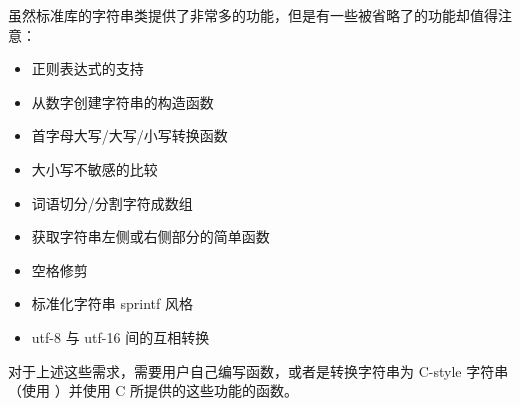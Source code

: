 \documentclass[../../LearnCpp.tex]{subfiles}
\begin{document}
虽然标准库的字符串类提供了非常多的功能，但是有一些被省略了的功能却值得注意：

\begin{itemize}
    \item 正则表达式的支持
    \item 从数字创建字符串的构造函数
    \item 首字母大写/大写/小写转换函数
    \item 大小写不敏感的比较
    \item 词语切分/分割字符成数组
    \item 获取字符串左侧或右侧部分的简单函数
    \item 空格修剪
    \item 标准化字符串 sprintf 风格
    \item utf-8 与 utf-16 间的互相转换
\end{itemize}

对于上述这些需求，需要用户自己编写函数，或者是转换字符串为 C-style 字符串（使用 ）并使用 C 所提供的这些功能的函数。
\end{document}
